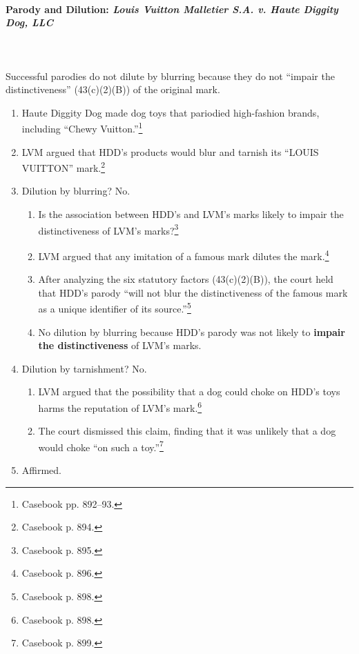 \paragraph{Parody and Dilution: \emph{Louis Vuitton Malletier S.A. v. Haute 
Diggity Dog, LLC}}
~\\\\
Successful parodies do not dilute by blurring because they 
do not ``impair the distinctiveness'' (43(c)(2)(B)) of the original mark.

\begin{enumerate}
    \item Haute Diggity Dog made dog toys that pariodied high-fashion brands, 
    including ``Chewy Vuitton.''\footnote{Casebook pp. 892--93.}
    \item LVM argued that HDD's products would blur and tarnish its ``LOUIS 
    VUITTON'' mark.\footnote{Casebook p. 894.}
    \item Dilution by blurring? No.
    \begin{enumerate}
        \item Is the association between HDD's and LVM's marks likely to 
        impair the distinctiveness of LVM's marks?\footnote{Casebook p. 895.}
        \item LVM argued that any imitation of a famous mark dilutes the 
        mark.\footnote{Casebook p. 896.}
        \item After analyzing the six statutory factors (43(c)(2)(B)), the 
        court held that HDD's parody ``will not blur the distinctiveness of 
        the famous mark as a unique identifier of its 
        source.''\footnote{Casebook p. 898.}
        \item No dilution by blurring because HDD's parody was not likely to 
        \textbf{impair the distinctiveness} of LVM's marks.
    \end{enumerate}
    \item Dilution by tarnishment? No.
    \begin{enumerate}
        \item LVM argued that the possibility that a dog could choke on HDD's 
        toys harms the reputation of LVM's mark.\footnote{Casebook p. 898.}
        \item The court dismissed this claim, finding that it was unlikely 
        that a dog would choke ``on such a toy.''\footnote{Casebook p. 899.}
    \end{enumerate}
    \item Affirmed.
\end{enumerate}

